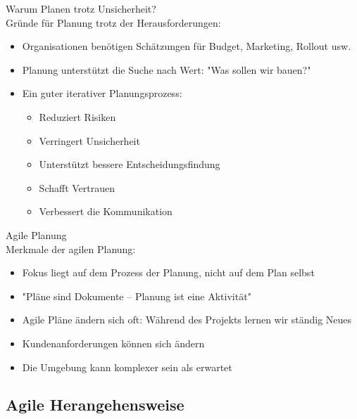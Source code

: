 \begin{concept}{Warum Planen trotz Unsicherheit?}\\
    Gründe für Planung trotz der Herausforderungen:
    \begin{itemize}
        \item Organisationen benötigen Schätzungen für Budget, Marketing, Rollout usw.
        \item Planung unterstützt die Suche nach Wert: "Was sollen wir bauen?"
        \item Ein guter iterativer Planungsprozess:
        \begin{itemize}
            \item Reduziert Risiken
            \item Verringert Unsicherheit
            \item Unterstützt bessere Entscheidungsfindung
            \item Schafft Vertrauen
            \item Verbessert die Kommunikation
        \end{itemize}
    \end{itemize}
\end{concept}

\begin{definition}{Agile Planung}\\
    Merkmale der agilen Planung:
    \begin{itemize}
        \item Fokus liegt auf dem Prozess der Planung, nicht auf dem Plan selbst
        \item "Pläne sind Dokumente – Planung ist eine Aktivität"
        \item Agile Pläne ändern sich oft: Während des Projekts lernen wir ständig Neues
        \item Kundenanforderungen können sich ändern
        \item Die Umgebung kann komplexer sein als erwartet
    \end{itemize}
\end{definition}

\subsection{Agile Herangehensweise}

